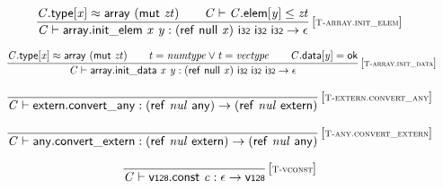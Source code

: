 $$
\begin{array}{@{}c@{}}\displaystyle
\frac{
{\mathit{C}}.\mathsf{type}[{\mathit{x}}] \approx \mathsf{array}~(\mathsf{mut}~{\mathit{zt}})
 \qquad
{\mathit{C}} \vdash {\mathit{C}}.\mathsf{elem}[{\mathit{y}}] \leq {\mathit{zt}}
}{
{\mathit{C}} \vdash \mathsf{array.init\_elem}~{\mathit{x}}~{\mathit{y}} : (\mathsf{ref}~\mathsf{null}~{\mathit{x}})~\mathsf{i{\scriptstyle32}}~\mathsf{i{\scriptstyle32}}~\mathsf{i{\scriptstyle32}} \rightarrow \epsilon
} \, {[\textsc{\scriptsize T{-}array.init\_elem}]}
\qquad
\end{array}
$$

$$
\begin{array}{@{}c@{}}\displaystyle
\frac{
{\mathit{C}}.\mathsf{type}[{\mathit{x}}] \approx \mathsf{array}~(\mathsf{mut}~{\mathit{zt}})
 \qquad
{\mathit{t}} = {\mathit{numtype}} \lor {\mathit{t}} = {\mathit{vectype}}
 \qquad
{\mathit{C}}.\mathsf{data}[{\mathit{y}}] = \mathsf{ok}
}{
{\mathit{C}} \vdash \mathsf{array.init\_data}~{\mathit{x}}~{\mathit{y}} : (\mathsf{ref}~\mathsf{null}~{\mathit{x}})~\mathsf{i{\scriptstyle32}}~\mathsf{i{\scriptstyle32}}~\mathsf{i{\scriptstyle32}} \rightarrow \epsilon
} \, {[\textsc{\scriptsize T{-}array.init\_data}]}
\qquad
\end{array}
$$

\vspace{1ex}

$$
\begin{array}{@{}c@{}}\displaystyle
\frac{
}{
{\mathit{C}} \vdash \mathsf{extern.convert\_any} : (\mathsf{ref}~{\mathit{nul}}~\mathsf{any}) \rightarrow (\mathsf{ref}~{\mathit{nul}}~\mathsf{extern})
} \, {[\textsc{\scriptsize T{-}extern.convert\_any}]}
\qquad
\end{array}
$$

$$
\begin{array}{@{}c@{}}\displaystyle
\frac{
}{
{\mathit{C}} \vdash \mathsf{any.convert\_extern} : (\mathsf{ref}~{\mathit{nul}}~\mathsf{extern}) \rightarrow (\mathsf{ref}~{\mathit{nul}}~\mathsf{any})
} \, {[\textsc{\scriptsize T{-}any.convert\_extern}]}
\qquad
\end{array}
$$

\vspace{1ex}

$$
\begin{array}{@{}c@{}}\displaystyle
\frac{
}{
{\mathit{C}} \vdash \mathsf{v{\scriptstyle128}}.\mathsf{const}~{\mathit{c}} : \epsilon \rightarrow \mathsf{v{\scriptstyle128}}
} \, {[\textsc{\scriptsize T{-}vconst}]}
\qquad
\end{array}
$$

